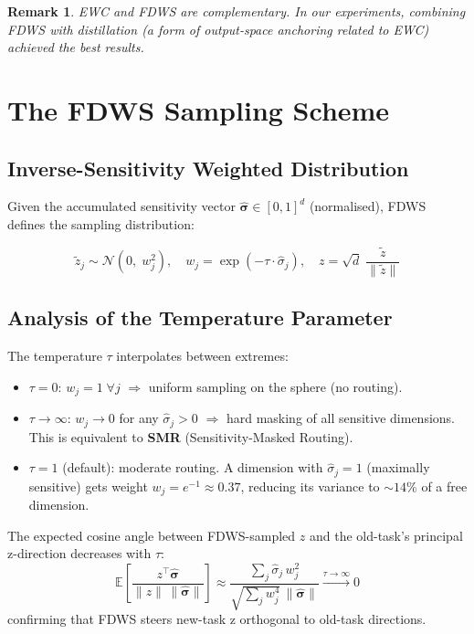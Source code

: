 \documentclass[11pt]{article}
\newcommand{\E}{\mathbb{E}}
\newtheorem{remark}{Remark}
\begin{document}
\begin{remark}
EWC and FDWS are complementary. In our experiments, combining FDWS with distillation (a form of output-space anchoring related to EWC) achieved the best results.
\end{remark}

\section{The FDWS Sampling Scheme}

\subsection{Inverse-Sensitivity Weighted Distribution}

Given the accumulated sensitivity vector $\hat{\bm{\sigma}} \in [0,1]^d$ (normalised), FDWS defines the sampling distribution:

\begin{equation}\label{eq:fdws-sampling}
    \boxed{
    \tilde{z}_j \sim \mathcal{N}\!\left(0,\; w_j^2\right), \quad
    w_j = \exp\!\left(-\tau \cdot \hat{\sigma}_j\right), \quad
    z = \sqrt{d}\;\frac{\tilde{z}}{\|\tilde{z}\|}
    }
\end{equation}

\subsection{Analysis of the Temperature Parameter}

The temperature $\tau$ interpolates between extremes:

\begin{itemize}[nosep]
    \item $\tau = 0$: $w_j = 1\;\forall j$ $\Rightarrow$ uniform sampling on the sphere (no routing).
    \item $\tau \to \infty$: $w_j \to 0$ for any $\hat{\sigma}_j > 0$ $\Rightarrow$ hard masking of all sensitive dimensions. This is equivalent to \textbf{SMR} (Sensitivity-Masked Routing).
    \item $\tau = 1$ (default): moderate routing. A dimension with $\hat{\sigma}_j = 1$ (maximally sensitive) gets weight $w_j = e^{-1} \approx 0.37$, reducing its variance to $\sim14\%$ of a free dimension.
\end{itemize}

The expected cosine angle between FDWS-sampled $z$ and the old-task's principal z-direction decreases with $\tau$:
\begin{equation}
    \E\!\left[\frac{z^\top \hat{\bm{\sigma}}}{\|z\|\,\|\hat{\bm{\sigma}}\|}\right] \approx \frac{\sum_j \hat{\sigma}_j\, w_j^2}{\sqrt{\sum_j w_j^4}\,\|\hat{\bm{\sigma}}\|} \xrightarrow{\tau \to \infty} 0
\end{equation}
confirming that FDWS steers new-task z orthogonal to old-task directions.
\end{document}
